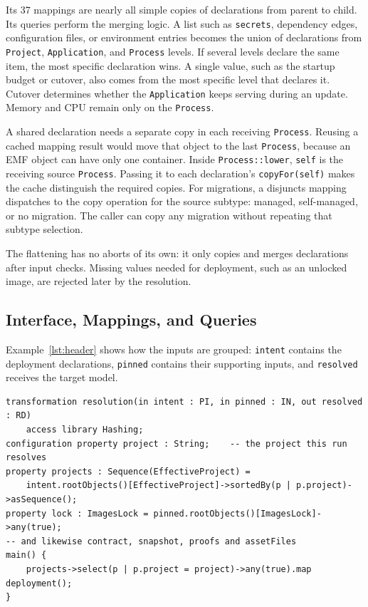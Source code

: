 Its 37 mappings are nearly all simple copies of declarations from parent to child. Its queries perform the merging logic. A
list such as \texttt{secrets}, dependency edges, configuration files, or environment entries becomes
the union of declarations from \texttt{Project}, \texttt{Application}, and
\texttt{Process} levels. If several levels declare the same item, the most
specific declaration wins. A single value, such as the startup budget or cutover, also comes from the most specific level that declares it. Cutover determines whether the \texttt{Application} keeps serving during an update. Memory and CPU remain
only on the \texttt{Process}.

A shared declaration needs a separate copy in each receiving
\texttt{Process}. Reusing a cached mapping result would move that object
to the last \texttt{Process}, because an EMF object can have only one
container. Inside \texttt{Process::lower}, \texttt{self} is the receiving
source \texttt{Process}. Passing it to each declaration's
\texttt{copyFor(self)} makes the cache distinguish the required copies.
For migrations, a disjuncts mapping dispatches to the copy operation for
the source subtype: managed, self-managed, or no migration. The caller can
copy any migration without repeating that subtype selection.

The flattening has no aborts of its own: it only copies and merges declarations
after input checks. Missing values needed for deployment, such as an
unlocked image, are rejected later by the resolution.

\subsection{Interface, Mappings, and Queries}
\label{sec:shape}

Example~\ref{lst:header} shows how the inputs are grouped: \texttt{intent}
contains the deployment declarations, \texttt{pinned} contains their
supporting inputs, and \texttt{resolved} receives the target model.

\begin{lstlisting}[language=qvto, style=report, caption={The Signature and Inputs of the Resolution, Abridged}, label={lst:header}]
transformation resolution(in intent : PI, in pinned : IN, out resolved : RD)
	access library Hashing;
configuration property project : String;    -- the project this run resolves
property projects : Sequence(EffectiveProject) =
	intent.rootObjects()[EffectiveProject]->sortedBy(p | p.project)->asSequence();
property lock : ImagesLock = pinned.rootObjects()[ImagesLock]->any(true);
-- and likewise contract, snapshot, proofs and assetFiles
main() {
	projects->select(p | p.project = project)->any(true).map deployment();
}
\end{lstlisting}

